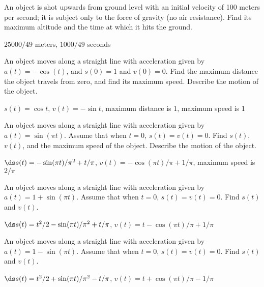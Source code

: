 \begin{exercises}
\begin{exercise} An object is shot upwards from ground level with an initial
velocity of 100 meters per second; it is subject only to the force of
gravity (no air resistance). Find its maximum altitude and the time at
which it hits the ground.
\begin{answer} $25000/49$ meters, $1000/49$ seconds
\end{answer}\end{exercise}

\begin{exercise} An object moves along a straight line with acceleration given by
$a(t) = -\cos(t)$, and $s(0)=1$ and
$v(0)=0$. Find the maximum distance the object travels from zero, and
find its maximum speed. Describe the motion of the object.
\begin{answer} $s(t)=\cos t$, $v(t)=-\sin t$,\hfill\break
maximum distance is 1,\hfill\break 
maximum speed is 1
\end{answer}\end{exercise}

\begin{exercise} An object moves along a straight line with acceleration given by
$a(t) = \sin(\pi t)$. Assume that when $t=0$, $s(t)=v(t)=0$. Find
$s(t)$, $v(t)$, and the maximum speed of the object. Describe the
motion of the object.
\begin{answer} $\ds s(t)=-\sin(\pi t)/\pi^2+t/\pi$,\hfill\break
 $v(t)=-\cos(\pi t)/\pi+1/\pi$,\hfill\break
maximum speed is $2/\pi$
\end{answer}\end{exercise}

\begin{exercise} An object moves along a straight line with acceleration given by
$a(t) = 1+\sin(\pi t)$. Assume that when $t=0$, $s(t)=v(t)=0$. Find
$s(t)$ and $v(t)$.
\begin{answer} $\ds s(t)=t^2/2-\sin(\pi t)/\pi^2+t/\pi$,\hfill\break
 $v(t)=t-\cos(\pi t)/\pi+1/\pi$
\end{answer}\end{exercise}

\begin{exercise} An object moves along a straight line with acceleration given by
$a(t) = 1-\sin(\pi t)$. Assume that when $t=0$, $s(t)=v(t)=0$. Find
$s(t)$ and $v(t)$.
\begin{answer} $\ds s(t)=t^2/2+\sin(\pi t)/\pi^2-t/\pi$,\hfill\break
 $v(t)=t+\cos(\pi t)/\pi-1/\pi$
\end{answer}\end{exercise}

\end{exercises}

